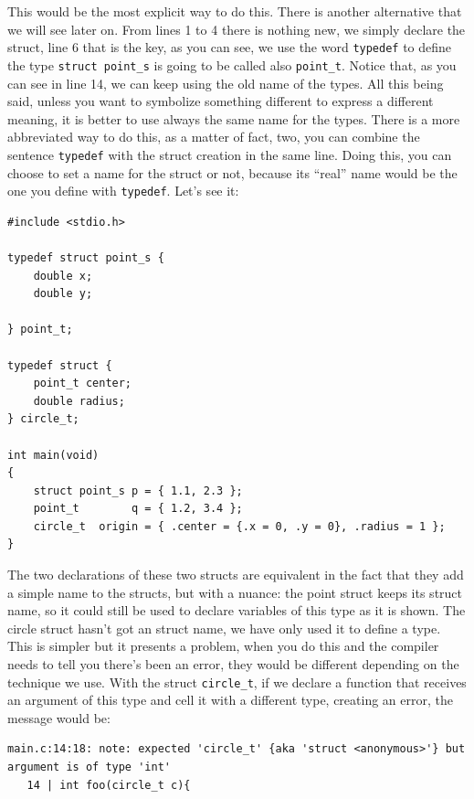\documentclass[a4paper]{article}
\begin{document}
This would be the most explicit way to do this. There is another alternative
that we will see later on. From lines 1 to 4 there is nothing new, we simply
declare the struct, line 6 that is the key, as you can see, we use the
word \verb!typedef! to define the type \verb!struct point_s! is going to be
called also \verb!point_t!. Notice that, as you can see in line 14, we can keep
using the old name of the types. All this being said, unless you want to
symbolize something different to express a different meaning, it is better to
use always the same name for the types. There is a more abbreviated way to do
this, as a matter of fact, two, you can combine the sentence \verb!typedef! with
the struct creation in the same line. Doing this, you can choose to set a name
for the struct or not, because its ``real'' name would be the one you define
with \verb!typedef!. Let's see it:

\noindent
\begin{minipage}[H]{\linewidth}
\mbox{}
\begin{lstlisting}[style=C,
caption={Different combinations of \texttt{struct} with \texttt{typedef}},
label={lst:structTypeCombo}]
#include <stdio.h>

typedef struct point_s {
    double x;
    double y;

} point_t;

typedef struct {
    point_t center;
    double radius;
} circle_t;

int main(void)
{
    struct point_s p = { 1.1, 2.3 };
    point_t        q = { 1.2, 3.4 };
    circle_t  origin = { .center = {.x = 0, .y = 0}, .radius = 1 };
}
\end{lstlisting}
\end{minipage}

The two declarations of these two structs are equivalent in the fact that they
add a simple name to the structs, but with a nuance: the point struct keeps its
struct name, so it could still be used to declare variables of this type as it
is shown. The circle struct hasn't got an struct name, we have only used it
to define a type. This is simpler but it presents a problem, when you do this
and the compiler needs to tell you
there's been an error, they would be different depending on the technique we
use. With the struct \verb!circle_t!, if we declare a function that receives
an argument of this type and cell it with a different type, creating an error,
the message would be:
\begin{lstlisting}[style=terminalStyle]
main.c:14:18: note: expected 'circle_t' {aka 'struct <anonymous>'} but argument is of type 'int'
   14 | int foo(circle_t c){
\end{lstlisting}
\end{document}
